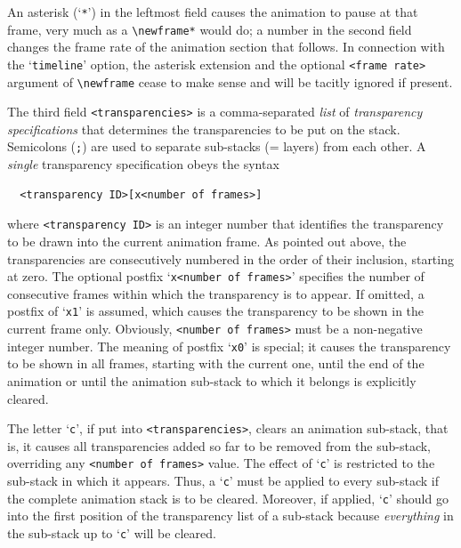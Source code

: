 \documentclass[a4paper]{article}
\begin{document}
An asterisk (`\verb+*+') in the leftmost field causes the animation to pause at that frame, very much as a \verb+\newframe*+ would do; a number in the second field changes the frame rate of the animation section that follows. In connection with the `\verb+timeline+' option, the asterisk extension and the optional \verb+<frame rate>+ argument of \verb+\newframe+ cease to make sense and will be tacitly ignored if present.

The third field \verb+<transparencies>+ is a comma-separated \emph{list} of \emph{transparency specifications} that determines the transparencies to be put on the stack. Semicolons (\verb+;+) are used to separate sub-stacks (= layers) from each other. A \emph{single} transparency specification obeys the syntax
\begin{verbatim}
  <transparency ID>[x<number of frames>]
\end{verbatim}
where \verb+<transparency ID>+ is an integer number that identifies the transparency to be drawn into the current animation frame. As pointed out above, the transparencies are consecutively numbered in the order of their inclusion, starting at zero. The optional postfix `\verb+x<number of frames>+' specifies the number of consecutive frames within which the transparency is to appear. If omitted, a postfix of `\verb+x1+' is assumed, which causes the transparency to be shown in the current frame only. Obviously, \verb+<number of frames>+ must be a non-negative integer number. The meaning of postfix `\verb+x0+' is special; it causes the transparency to be shown in all frames, starting with the current one, until the end of the animation or until the animation sub-stack to which it belongs is explicitly cleared.

The letter `\verb+c+', if put into \verb+<transparencies>+, clears an animation sub-stack, that is, it causes all transparencies added so far to be removed from the sub-stack, overriding any \verb+<number of frames>+ value. The effect of `\verb+c+' is restricted to the sub-stack in which it appears. Thus, a `\verb+c+' must be applied to every sub-stack if the complete animation stack is to be cleared. Moreover, if applied, `\verb+c+' should go into the first position of the transparency list of a sub-stack because \emph{everything} in the sub-stack up to `\verb+c+' will be cleared.

\end{document}

